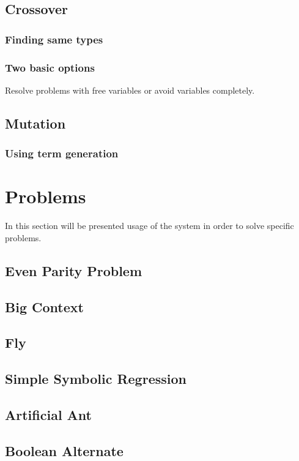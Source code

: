 \documentclass[12pt,a4paper]{report}
\begin{document}
	\section{Crossover}
		\subsection{Finding same types}
		\subsection{Two basic options}
		Resolve problems with free variables or avoid variables completely. 
		
	\section{Mutation}
		\subsection{Using term generation}


\chapter{Problems}
	In this section will be presented usage of the system in order to solve specific problems.
		
	
		\section{Even Parity Problem}
		\section{Big Context}
		\section{Fly}
		\section{Simple Symbolic Regression}
		\section{Artificial Ant}
		\section{Boolean Alternate}
	

\end{document}
